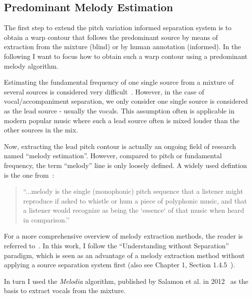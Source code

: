 \subsection{Predominant Melody Estimation}

The first step to extend the pitch variation informed separation system is to obtain a warp contour that follows the predominant source by means of extraction from the mixture (blind) or by human annotation (informed).
In the following I want to focus how to obtain such a warp contour using a predominant melody algorithm.\par

Estimating the fundamental frequency of one single source from a mixture of several sources is considered very difficult~\cite{klapuri08}.
However, in the case of vocal/accompaniment separation, we only consider one single source is considered as the lead source - usually the vocals.
This assumption often is applicable in modern popular music where such a lead source often is mixed louder than the other sources in the mix.
\par
Now, extracting the lead pitch contour is actually an ongoing field of research named ``melody estimation''.
However, compared to pitch or fundamental frequency, the term ``melody'' line  is only loosely defined.
A widely used defintion is the one from~\cite{poliner07}:

\begin{quote}
  ``...melody is the single (monophonic) pitch sequence that a listener might reproduce if asked to whistle or hum a piece of polyphonic music, and that a listener would recognize as being the `essence` of that music when heard in comparison.''
\end{quote}

For a more comprehensive overview of melody extraction methods, the reader is referred to~\cite{salamon14}.
In this work, I follow the ``Understanding without Separation'' paradigm, which is seen as an advantage of a melody extraction method without applying a source separation system first (also see Chapter 1, Section 1.4.5~\cite{salamon14}).\par

In turn I used the \emph{Melodia} algorithm, published by Salamon et al. in 2012~\cite{salamon12} as the basis to extract vocals from the mixture.\par

